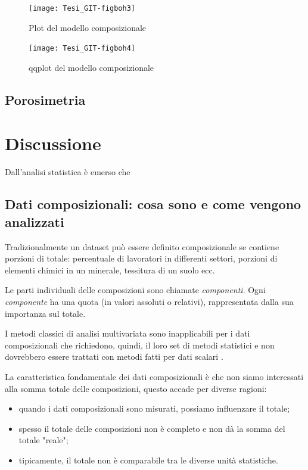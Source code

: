 \documentclass[11pt, a4paper, openright, titlepage, final, language = italian]{book}
\begin{document}
\begin{figure}[ht]
  \centering 
\texttt{[image: Tesi\_GIT-figboh3]}
  \caption{Plot del modello composizionale}
\end{figure}


\begin{figure}[ht]
  \centering 
\texttt{[image: Tesi\_GIT-figboh4]}
  \caption{qqplot del modello composizionale }
  \label{fig:qqplot_dinamica_aggregati}
\end{figure}

\section{Porosimetria}


\chapter{Discussione}

Dall'analisi statistica \`e emerso che  
\section{Dati composizionali: cosa sono e come vengono analizzati
  \citep{van2013analyzing}}

Tradizionalmente un dataset pu\`o essere definito composizionale se
contiene porzioni di totale: percentuale di lavoratori in differenti
settori, porzioni di elementi chimici in un minerale, tessitura di un
suolo ecc.

Le parti individuali delle composizioni sono chiamate
\emph{componenti}. Ogni \emph{componente} ha una quota (in valori
  assoluti o relativi), rappresentata dalla sua importanza sul totale.

I metodi classici di analisi multivariata sono inapplicabili per i dati
composizionali che richiedono, quindi, il loro set di metodi
statistici e non dovrebbero essere trattati con metodi fatti per dati
scalari \citep{aitchison1986statistical}.

La caratteristica fondamentale dei dati composizionali \`e che non
siamo interessati alla somma totale delle composizioni, questo accade
per diverse ragioni:
\begin{itemize}
  \item quando i dati composizionali sono misurati, possiamo
    influenzare il totale;
   \item spesso il totale delle composizioni non \`e completo e non dà
     la somma del totale "reale";
   \item tipicamente, il totale non \`e comparabile tra le diverse
     unit\`a statistiche.
\end{itemize}
\end{document}
